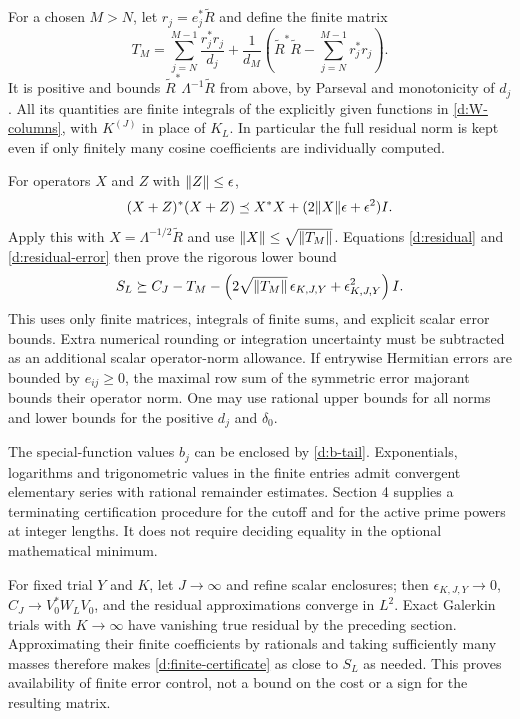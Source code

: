 For a chosen $M>N$, let $r_j=e_j^*\widetilde R$ and define the finite
matrix
\begin{equation}\label{d:weighted-tail}
T_M=\sum_{j=N}^{M-1}\frac{r_j^*r_j}{d_j}
+\frac1{d_M}\left(\widetilde R^*\widetilde R-
\sum_{j=N}^{M-1}r_j^*r_j\right).
\end{equation}
It is positive and bounds $\widetilde R^*\Lambda^{-1}\widetilde R$ from
above, by Parseval and monotonicity of $d_j$. All its quantities are finite
integrals of the explicitly given functions in \eqref{d:W-columns}, with
$K^{(J)}$ in place of $K_L$. In particular the full residual norm is kept
even if only finitely many cosine coefficients are individually computed.

For operators $X$ and $Z$ with $\lVert Z\rVert\le\epsilon$,
\[
(X+Z)^*(X+Z)\preceq X^*X+(2\lVert X\rVert\epsilon+\epsilon^2)I.
\]
Apply this with $X=\Lambda^{-1/2}\widetilde R$ and use
$\lVert X\rVert\le\sqrt{\lVert T_M\rVert}$. Equations \eqref{d:residual} and
\eqref{d:residual-error} then prove the rigorous lower bound
\begin{equation}\label{d:finite-certificate}
S_L\succeq C_J-T_M-
\left(2\sqrt{\lVert T_M\rVert}\,\epsilon_{K,J,Y}
+\epsilon_{K,J,Y}^2\right)I.
\end{equation}
This uses only finite matrices, integrals of finite sums, and explicit
scalar error bounds. Extra numerical rounding or integration uncertainty
must be subtracted as an additional scalar operator-norm allowance.
If entrywise Hermitian errors are bounded by $e_{ij}\ge0$, the maximal
row sum of the symmetric error majorant bounds their operator norm.
One may use rational upper bounds for all norms and lower bounds for
the positive $d_j$ and $\delta_0$.

The special-function values $b_j$ can be enclosed by \eqref{d:b-tail}.
Exponentials, logarithms and trigonometric values in the finite entries
admit convergent elementary series with rational remainder estimates.
Section 4 supplies a terminating certification procedure for the cutoff
and for the active prime powers at integer lengths. It does not require
deciding equality in the optional mathematical minimum.

For fixed trial $Y$ and $K$, let $J\to\infty$ and refine scalar enclosures;
then $\epsilon_{K,J,Y}\to0$, $C_J\to V_0^*W_LV_0$, and the residual
approximations converge in $L^2$. Exact Galerkin trials with $K\to\infty$
have vanishing true residual by the preceding section. Approximating their
finite coefficients by rationals and taking sufficiently many masses
therefore makes \eqref{d:finite-certificate} as close to $S_L$ as needed.
This proves availability of finite error control, not a bound on the cost
or a sign for the resulting matrix.

